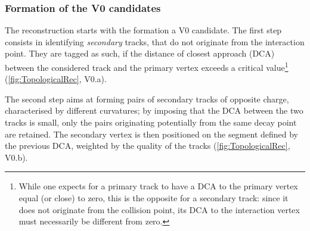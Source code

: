 \subsubsection{Formation of the V0 candidates}
\label{subsubsec:V0Formation}

The reconstruction starts with the formation a V0 candidate. The first step consists in identifying \textit{secondary} tracks, that do not originate from the interaction point. They are tagged as such, if the distance of closest approach (DCA) between the considered track and the primary vertex exceeds a critical value\footnote{While one expects for a primary track to have a DCA to the primary vertex equal (or close) to zero, this is the opposite for a secondary track: since it does not originate from the collision point, its DCA to the interaction vertex must necessarily be different from zero.} (\fig\ref{fig:TopologicalRec}, V0.a). 

The second step aims at forming pairs of secondary tracks of opposite charge, \ie characterised by different curvatures; by imposing that the DCA between the two tracks is small, only the pairs originating potentially from the same decay point are retained. The secondary vertex is then positioned on the segment defined by the previous DCA, weighted by the quality of the tracks (\fig\ref{fig:TopologicalRec}, V0.b).

